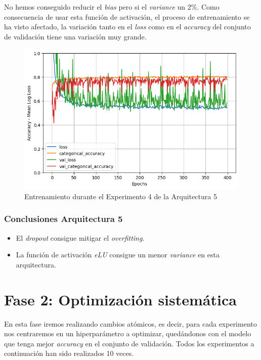 \documentclass{article}
\begin{document}
		    No hemos conseguido reducir el \textit{bias} pero si el \textit{variance} un 2\%. Como consecuencia de usar esta funci\'on de activaci\'on, el proceso de entrenamiento se ha visto afectado, la variaci\'on tanto en el \textit{loss} como en el \textit{accuracy} del conjunto de validaci\'on tiene una variaci\'on muy grande.
			\begin{figure}[!h]
				\begin{center}
					\includegraphics[scale=0.5]{d-tr-a5-e4.png}		
					\caption{Entrenamiento durante el Experimento 4 de la Arquitectura 5}	
					\label{d-tr-a5-e4}
				\end{center}
			\end{figure}
		
		
		\subsubsection{Conclusiones Arquitectura 5}
		\label{d-cl-a5}
			\begin{itemize}
				\item El \textit{dropout} consigue mitigar el \textit{overfitting}.
				\item La funci\'on de activaci\'on \textit{eLU} consigue un menor \textit{variance} en esta arquitectura.
			\end{itemize}
		
\section{Fase 2: Optimizaci\'on sistem\'atica}
	En esta fase iremos realizando cambios at\'omicos, es decir, para cada experimento nos centraremos en un hiperpar\'ametro a optimizar, qued\'andonos con el modelo que tenga mejor \textit{accuracy} en el conjunto de validaci\'on. Todos los experimentos a continuaci\'on han sido realizados 10 veces.
	
\end{document}
